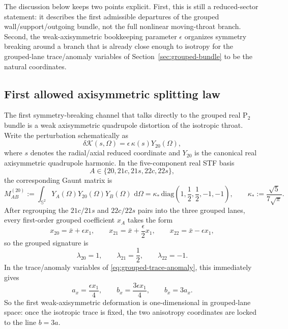 \documentclass[11pt]{article}
\theoremstyle{definition}
\newcommand{\dd}{\,\mathrm{d}}
\newcommand{\Ptwo}{\ensuremath{\mathrm{P}_2}}
\newcommand{\diag}{\mathrm{diag}}
\newcommand{\cK}{\mathcal K}
\newcommand{\bbS}{\mathbb S}
\begin{document}
The discussion below keeps two points explicit. First, this is still a reduced-sector statement: it describes the first admissible departures of the grouped wall/support/outgoing bundle, not the full nonlinear moving-throat branch. Second, the weak-axisymmetric bookkeeping parameter $\epsilon$ organizes symmetry breaking around a branch that is already close enough to isotropy for the grouped-lane trace/anomaly variables of Section~\ref{sec:grouped-bundle} to be the natural coordinates.

\subsection{First allowed axisymmetric splitting law}

The first symmetry-breaking channel that talks directly to the grouped real $\Ptwo$ bundle is a weak axisymmetric quadrupole distortion of the isotropic throat. Write the perturbation schematically as
\begin{equation}
 \delta \cK(s,\Omega)=\epsilon\,\kappa(s)Y_{20}(\Omega),
 \label{eq:weakax-axisymmetric-perturbation}
\end{equation}
where $s$ denotes the radial/axial reduced coordinate and $Y_{20}$ is the canonical real axisymmetric quadrupole harmonic. In the five-component real STF basis
\[
 A\in\{20,21c,21s,22c,22s\},
\]
the corresponding Gaunt matrix is
\begin{equation}
 M^{(20)}_{AB}
 :=
 \int_{\bbS^2} Y_A(\Omega)Y_{20}(\Omega)Y_B(\Omega)\,\dd\Omega
 =
 \kappa_*\,\diag\!\left(1,\frac12,\frac12,-1,-1\right),
 \qquad
 \kappa_*:=\frac{\sqrt5}{7\sqrt\pi}.
 \label{eq:weakax-gaunt-matrix}
\end{equation}
After regrouping the $21c/21s$ and $22c/22s$ pairs into the three grouped lanes, every first-order grouped coefficient $x_A$ takes the form
\begin{equation}
 x_{20}=\bar x+\epsilon x_1,
 \qquad
 x_{21}=\bar x+\frac{\epsilon}{2}x_1,
 \qquad
 x_{22}=\bar x-\epsilon x_1,
 \label{eq:weakax-x-splitting}
\end{equation}
so the grouped signature is
\begin{equation}
 \lambda_{20}=1,
 \qquad
 \lambda_{21}=\frac12,
 \qquad
 \lambda_{22}=-1.
 \label{eq:weakax-lambda-signature}
\end{equation}
In the trace/anomaly variables of \eqref{eq:grouped-trace-anomaly}, this immediately gives
\begin{equation}
 a_x=\frac{\epsilon x_1}{4},
 \qquad
 b_x=\frac{3\epsilon x_1}{4},
 \qquad
 b_x=3a_x.
 \label{eq:weakax-b-equals-3a}
\end{equation}
So the first weak-axisymmetric deformation is one-dimensional in grouped-lane space: once the isotropic trace is fixed, the two anisotropy coordinates are locked to the line $b=3a$.
\end{document}
